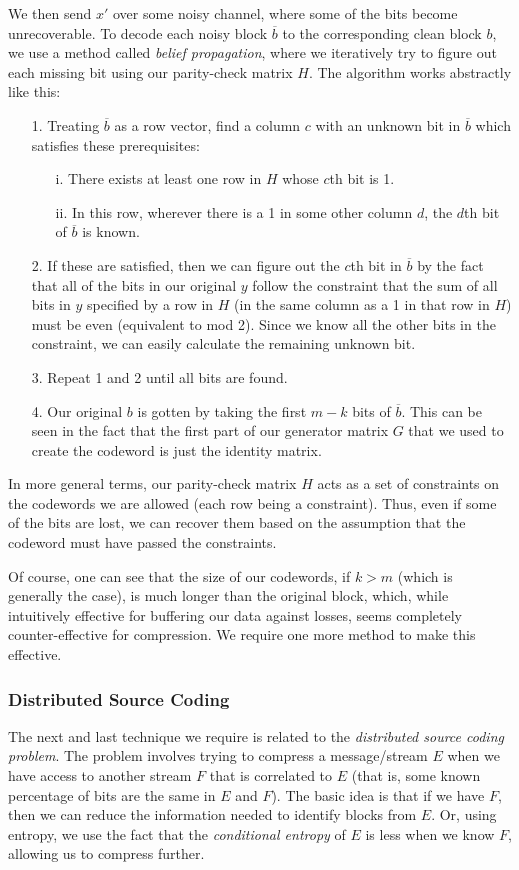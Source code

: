 \documentclass[11pt]{article}
\begin{document}
We then send $x'$ over some noisy channel, where some of the bits become unrecoverable. 
To decode each noisy block $\overline{b}$ to the corresponding clean block $b$, 
we use a method called \emph{belief propagation}, 
where we iteratively try to figure out each missing bit using our parity-check matrix $H$. 
The algorithm works abstractly like this:
\begin{itemize}
	\item[1.]Treating $\overline{b}$ as a row vector, find a column $c$ with an unknown bit in $\overline{b}$ 
which satisfies these prerequisites:
	\begin{itemize}
		\item[i.]There exists at least one row in $H$ whose $c$th bit is 1.
		\item[ii.]In this row, wherever there is a 1 in some other column $d$, the $d$th bit of $\overline{b}$ is known. 
	\end{itemize}
	\item[2.]If these are satisfied, then we can figure out the $c$th bit in $\overline{b}$ by the fact that all of the 
bits in our original $y$ follow the constraint that the sum of all bits in $y$ specified by a row in $H$ 
(in the same column as a 1 in that row in $H$) must be even (equivalent to mod 2). 
Since we know all the other bits in the constraint, we can easily calculate the remaining unknown bit.
	\item[3.]Repeat 1 and 2 until all bits are found.
	\item[4.]Our original $b$ is gotten by taking the first $m-k$ bits of $\overline{b}$. 
This can be seen in the fact that the first part of our generator matrix $G$ that we used to create 
the codeword is just the identity matrix.
\end{itemize}
In more general terms, our parity-check matrix $H$ acts as a set of constraints on the codewords we are 
allowed (each row being a constraint). Thus, even if some of the bits are lost, we can recover them based on the assumption that 
the codeword must have passed the constraints. 

Of course, one can see that the size of our codewords, if $k>m$ (which is generally the case), 
is much longer than the original block, which, 
while intuitively effective for buffering our data against losses, seems completely counter-effective for compression. 
We require one more method to make this effective. 

\subsubsection{Distributed Source Coding}\label{distributed-source-coding-subsubsect}
The next and last technique we require is related to the \emph{distributed source coding problem}\cite{johnson}. 
The problem involves trying to compress a message/stream $E$ when we have access to another stream $F$ 
that is correlated to $E$ (that is, some known percentage of bits are the same in $E$ and $F$). 
The basic idea is that if we have $F$, then we can reduce the information 
needed to identify blocks from $E$. Or, using entropy, 
we use the fact that the \emph{conditional entropy} of $E$ is less when we know $F$, 
allowing us to compress further. 
\end{document}
